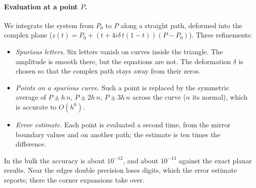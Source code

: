 \documentclass[11pt]{article}
\begin{document}
\begin{center}
\end{center}

\paragraph{Evaluation at a point $P$.}
We integrate the system from $P_0$ to $P$ along a straight path, deformed into the complex plane
($z(t)=P_0+(t+4i\delta\,t(1-t))(P-P_0)$). Three refinements:
\begin{itemize}
\item \emph{Spurious letters.} Six letters vanish on curves inside the triangle. The amplitude is smooth there, but
  the equations are not. The deformation $\delta$ is chosen so that the complex path stays away from their zeros.
\item \emph{Points on a spurious curve.} Such a point is replaced by the symmetric average of $P\pm h\,n$,
  $P\pm 2h\,n$, $P\pm 3h\,n$ across the curve ($n$ its normal), which is accurate to $O(h^6)$.
\item \emph{Error estimate.} Each point is evaluated a second time, from the mirror boundary values and on another
  path; the estimate is ten times the difference.
\end{itemize}
In the bulk the accuracy is about $10^{-12}$, and about $10^{-13}$ against the exact planar results. Near the edges
double precision loses digits, which the error estimate reports; there the corner expansions take over.
\end{document}
